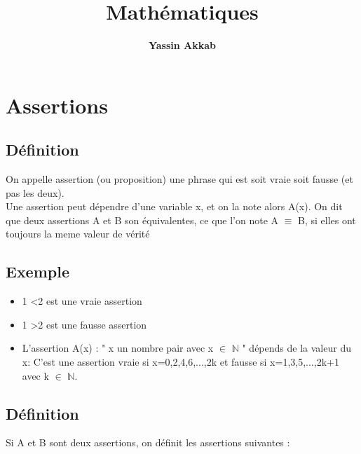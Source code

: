 \documentclass{article}
\title{\textbf{Mathématiques}}
\author{\textbf{Yassin Akkab}}
\begin{document}
	
	\maketitle
	
	
	
	\tableofcontents
	
	\newpage
	
	
	
	\section{Assertions}
	
	\subsection{Définition }
		
		On appelle assertion (ou proposition) une phrase qui est soit vraie soit fausse (et pas les deux). \\		
		Une assertion peut dépendre d’une variable x, et on la note alors A(x).		
		On dit que deux assertions A et B son équivalentes, ce que l'on note A $\equiv$ B, si elles ont toujours la meme valeur de vérité 
	\subsection{Exemple}
	
	\begin{itemize}
		
		\item {1 \textless 2 est une vraie assertion}
	
		\item { 1 \textgreater 2 est une fausse assertion}
		
		\item {L'assertion A(x) : " x un nombre pair avec x $\in$ $\mathbb{N}$ " dépends de la valeur du x: C'est une assertion vraie si x=0,2,4,6,...,2k et fausse si x=1,3,5,...,2k+1 avec k $\in$ $\mathbb{N}$.
	}
		
		
	\end{itemize}
	
	\subsection{Définition}
	
	Si A et B sont deux assertions, on définit les assertions suivantes :
	
\end{document}
